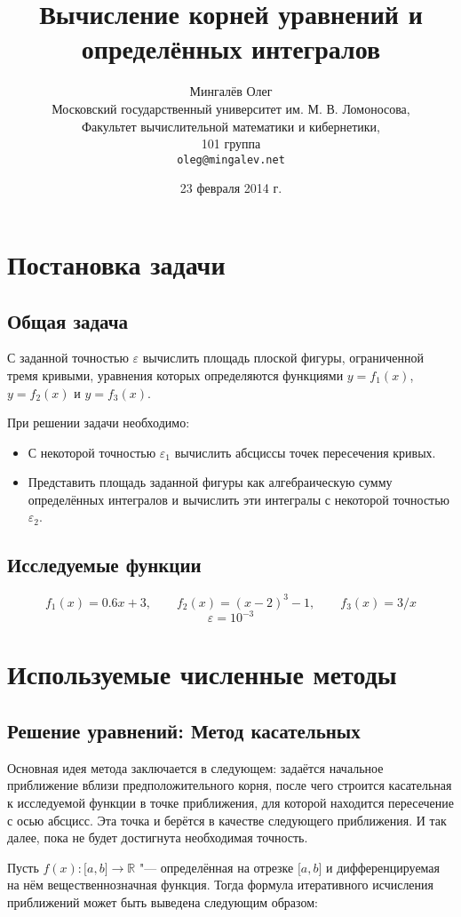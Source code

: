 \documentclass{report}
\author{{\huge Мингалёв Олег}\\
Московский государственный университет им. М. В. Ломоносова,\\
Факультет вычислительной математики и кибернетики,\\
101 группа\\
\texttt{oleg@mingalev.net}}
\title{Вычисление корней уравнений и определённых интегралов}
\date{23 февраля 2014 г.}
\begin{document}
\maketitle
\tableofcontents
\chapter{Постановка задачи}
\section{Общая задача}

С заданной точностью $ \varepsilon $ вычислить площадь плоской фигуры, ограниченной тремя кривыми, уравнения которых определяются функциями $ y = f_1(x) $, $ y = f_2(x) $ и $ y = f_3(x) $.

При решении задачи необходимо:
\begin{itemize}
    \item С некоторой точностью $ \varepsilon{}_1 $ вычислить абсциссы точек пересечения кривых.
    \item Представить площадь заданной фигуры как алгебраическую сумму определённых интегралов и вычислить эти интегралы с некоторой точностью $ \varepsilon{}_2 $.
\end{itemize}

\section{Исследуемые функции}
\[ f_1(x) = 0.6x + 3, \qquad
f_2(x) = (x-2)^3 - 1, \qquad
f_3(x) = 3/x \]
\[ \varepsilon = 10^{-3} \]

\chapter{Используемые численные методы}
\section{Решение уравнений: Метод касательных}

Основная идея метода заключается в следующем: задаётся начальное приближение вблизи предположительного корня, после чего строится касательная к исследуемой функции в точке приближения, для которой находится пересечение с осью абсцисс. Эта точка и берётся в качестве следующего приближения. И так далее, пока не будет достигнута необходимая точность.

Пусть $ f(x): \lbrack a, b\rbrack \rightarrow \mathbb{R} $ "--- определённая на отрезке $ \lbrack a, b \rbrack $ и дифференцируемая на нём вещественнозначная функция. Тогда формула итеративного исчисления приближений может быть выведена следующим образом:
\end{document}
